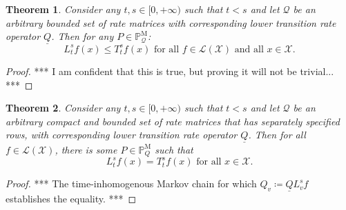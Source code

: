 \documentclass[a4paper,reqno]{amsart}
\newtheorem{theorem}{Theorem}
\newcommand{\states}{\mathcal{X}}
\newcommand{\processes}{\mathbb{P}}
\newcommand{\mprocesses}{\processes^{\mathrm{M}}}
\newcommand{\lbound}{L}
\newcommand{\gambles}{\mathcal{L}}
\newcommand{\gamblesX}{\gambles(\states)}
\newcommand{\rateset}{\mathcal{Q}}
\newcommand{\lrate}{\underline{Q}}
\begin{document}
\begin{theorem}
Consider any $t,s\in[0,+\infty)$ such that $t<s$ and let $\rateset$ be an arbitrary bounded set of rate matrices with corresponding lower transition rate operator $\lrate$. Then for any $P\in\mprocesses_\rateset$:
\begin{equation*}
\lbound_t^sf(x)\leq T_t^sf(x)
\text{ for all $f\in\gamblesX$ and all $x\in\states$.}
\end{equation*}
\end{theorem}
\begin{proof}
*** I am confident that this is true, but proving it will not be trivial... ***
\end{proof}

\begin{theorem}
Consider any $t,s\in[0,+\infty)$ such that $t<s$ and let $\rateset$ be an arbitrary compact and bounded set of rate matrices that has separately specified rows, with corresponding lower transition rate operator $\lrate$. Then for all $f\in\gamblesX$, there is some $P\in\mprocesses_Q$ such that
\begin{equation*}
\lbound_t^sf(x)=T_t^sf(x)
\text{ for all $x\in\states$.}
\end{equation*}
\end{theorem}
\begin{proof}
*** The time-inhomogenous Markov chain for which $Q_v\coloneqq\lrate\lbound_v^sf$ establishes the equality. ***
\end{proof}

 
%
\end{document}
